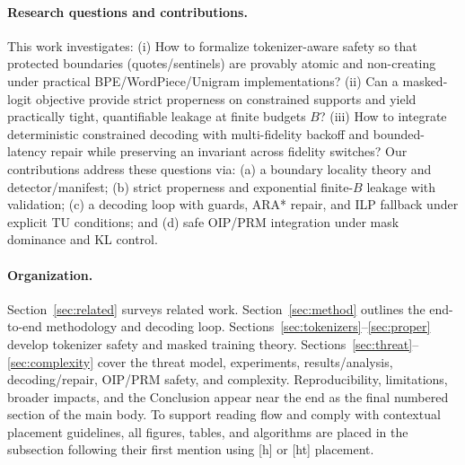 \documentclass{article}
\begin{document}
\paragraph{Research questions and contributions.} This work investigates:
(i) How to formalize tokenizer-aware safety so that protected boundaries (quotes/sentinels) are provably atomic and non-creating under practical BPE/WordPiece/Unigram implementations?
(ii) Can a masked-logit objective provide strict properness on constrained supports and yield practically tight, quantifiable leakage at finite budgets $B$?
(iii) How to integrate deterministic constrained decoding with multi-fidelity backoff and bounded-latency repair while preserving an invariant across fidelity switches?
Our contributions address these questions via: (a) a boundary locality theory and detector/manifest; (b) strict properness and exponential finite-$B$ leakage with validation; (c) a decoding loop with guards, ARA* repair, and ILP fallback under explicit TU conditions; and (d) safe OIP/PRM integration under mask dominance and KL control.

\paragraph{Organization.} Section~\ref{sec:related} surveys related work. Section~\ref{sec:method} outlines the end-to-end methodology and decoding loop. Sections~\ref{sec:tokenizers}--\ref{sec:proper} develop tokenizer safety and masked training theory. Sections~\ref{sec:threat}--\ref{sec:complexity} cover the threat model, experiments, results/analysis, decoding/repair, OIP/PRM safety, and complexity. Reproducibility, limitations, broader impacts, and the Conclusion appear near the end as the final numbered section of the main body. To support reading flow and comply with contextual placement guidelines, all figures, tables, and algorithms are placed in the subsection following their first mention using [h] or [ht] placement.
\end{document}
